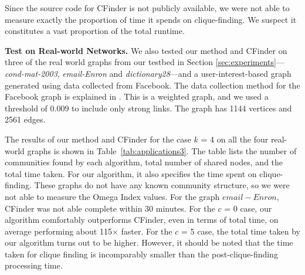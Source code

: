Since the source code for CFinder is not publicly available, we were not able to measure exactly the proportion of time it spends on clique-finding. 
We suspect it constitutes a vast proportion of the total runtime.


{\bf Test on Real-world Networks. } We also tested our method and CFinder on three of the real world graphs from our testbed in Section \ref{sec:experiments}---{\em cond-mat-2003}, {\em email-Enron} and {\em dictionary28}---and a user-interest-based graph generated using data collected from Facebook. The data collection method for the Facebook graph is explained in \cite{dianapaper}. This is a weighted graph, and we used a threshold of 0.009 to include only strong links. The graph has 1144 vertices and 2561 edges. 

The results of our method and CFinder for the case $k$ = 4 on all the four 
real-world graphs is shown in  Table~\ref{tab:applications3}. The table lists the number of communities found by each algorithm, total number of shared nodes, and the total time taken. For our algorithm, it also specifies the time spent on clique-finding. These graphs do not have any known community structure, so we were not able to measure the Omega Index values. For the graph $email-Enron$, CFinder was not able complete within 30 minutes. For the $c$ = 0 case, our algorithm comfortably outperforms CFinder, even in terms of total time, on average performing about 115$\times$ faster. For the $c$ = 5 case, the total time taken by our algorithm turns out to be higher. However, it should be noted that the time taken for clique finding is incomparably smaller than the post-clique-finding processing time.  

